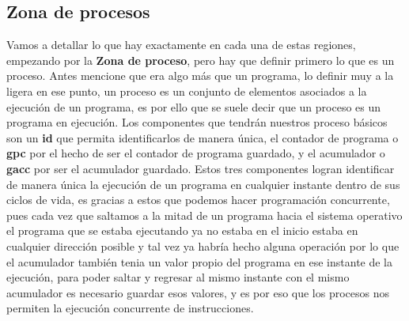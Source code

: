 \documentclass[12pt]{article}
\begin{document}
	
	\subsection{Zona de procesos}
	
	Vamos a detallar lo que hay exactamente en cada una de estas regiones, empezando por la \textbf{Zona de proceso}, pero
	hay que definir primero lo que es un proceso. Antes mencione que era algo más que un programa, lo definir muy a la ligera
	en ese punto, un proceso es un conjunto de elementos asociados a la ejecución de un programa, es por ello que se
	suele decir que un proceso es un programa en ejecución. Los componentes que tendrán nuestros proceso básicos son un
	\textbf{id} que permita identificarlos de manera única, el contador de programa o \textbf{gpc} por el hecho de ser el contador
	de programa guardado, y el acumulador o \textbf{gacc} por ser el acumulador guardado. Estos tres componentes logran identificar
	de manera única la ejecución de un programa en cualquier instante dentro de sus ciclos de vida, es gracias a estos que
	podemos hacer programación concurrente, pues cada vez que saltamos a la mitad de un programa hacia el sistema operativo 
	el programa que se estaba ejecutando ya no estaba en el inicio estaba en cualquier dirección posible y tal vez ya
	habría hecho alguna operación por lo que el acumulador también tenia un valor propio del programa en ese instante de la ejecución,
	para poder saltar y regresar al mismo instante con el mismo acumulador es necesario guardar esos valores, y es por eso que los
	procesos nos permiten la ejecución concurrente de instrucciones. 
	
\end{document}
